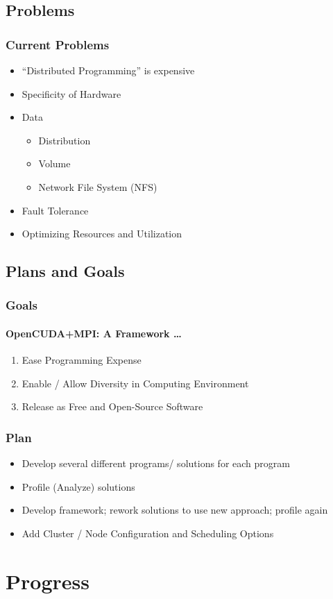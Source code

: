 \documentclass{beamer}
\begin{document}
\subsection{Problems}
\begin{frame}
\frametitle{Current Problems}
\begin{itemize}
\item{``Distributed Programming'' is expensive}
\item{Specificity of Hardware}
\item{Data}
\begin{itemize}
\item{Distribution}
\item{Volume}
\item{Network File System (NFS)}
\end{itemize}
\item{Fault Tolerance}
\item{Optimizing Resources and Utilization}
\end{itemize}
\end{frame}
\subsection{Plans and Goals}
\begin{frame}
\frametitle{Goals}
\framesubtitle{OpenCUDA+MPI\@: A Framework \dots{}}
\begin{enumerate}
\item{Ease Programming Expense}
\item{Enable / Allow Diversity in Computing Environment}
\item{Release as Free and Open-Source Software}
\end{enumerate}
\end{frame}
\begin{frame}
\frametitle{Plan}
\begin{itemize}
\item{Develop several different programs/ solutions for each program}
\item{Profile (Analyze) solutions}
\item{Develop framework; rework solutions to use new approach; profile again}
\item{Add Cluster / Node Configuration and Scheduling Options}
\end{itemize}
\end{frame}
\section{Progress}
\end{document}
